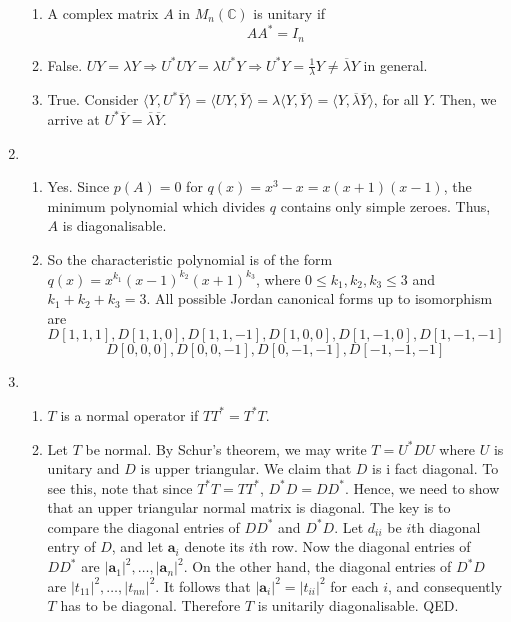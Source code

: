 \documentclass[12pt]{article}
\theoremstyle{definition}
\begin{document}
\begin{enumerate}
\begin{enumerate}
    \item A complex matrix $A$ in $M_n(\mathbb{C})$ is unitary if
    \[
AA^\ast = I_n
    \]
    \item False. $UY=\lambda Y \Rightarrow U^\ast UY=\lambda U^\ast Y\Rightarrow U^\ast Y=\frac{1}{\lambda}Y\neq \overline{\lambda}Y$ in general. 
    \item True. Consider $\langle Y, U^\ast \overline{Y}\rangle = \langle UY, \overline{Y}\rangle = \lambda\langle Y, \overline{Y}\rangle = \langle Y, \overline{\lambda}\overline{Y}\rangle$, for all $Y$. Then, we arrive at $U^\ast \overline{Y}=\overline{\lambda}\overline{Y}$.
  \end{enumerate}
  \item \begin{enumerate}
  \item Yes. Since $p(A)=0$ for $q(x)=x^3-x=x(x+1)(x-1)$, the minimum polynomial which divides $q$ contains only simple zeroes. Thus, $A$ is diagonalisable.
  \item So the characteristic polynomial is of the form $q(x)=x^{k_1}(x-1)^{k_2}(x+1)^{k_3}$, where $0\leq k_1,k_2,k_3\leq 3$ and $k_1+k_2+k_3=3$. All possible Jordan canonical forms up to isomorphism are
  \[
D[1,1,1], D[1,1,0], D[1,1,-1],D[1,0,0], D[1,-1,0], D[1,-1,-1]
  \]
  \[
 D[0,0,0], D[0,0,-1], D[0,-1,-1],D[-1,-1,-1]
  \]
\end{enumerate}
  \item \begin{enumerate}
  \item $T$ is a normal operator if $TT^\ast = T^\ast T$.
  \item Let $T$ be normal. By Schur's theorem, we may write $T=U^\ast DU$ where $U$ is unitary and $D$ is upper triangular. We claim that $D$ is i fact diagonal. To see this, note that since $T^\ast T = TT^\ast$, $D^\ast D = DD^\ast$. Hence, we need to show that an upper triangular normal matrix is diagonal. The key is to compare the diagonal entries of $DD^\ast$ and $D^\ast D$. Let $d_{ii}$ be $i$th diagonal entry of $D$, and let $\mathbf{a}_i$ denote its $i$th row. Now the diagonal entries of $DD^\ast$ are $|\mathbf{a}_1|^2, \ldots, |\mathbf{a}_n|^2$. On the other hand, the diagonal entries of $D^\ast D$ are $|t_{11}|^2,\ldots, |t_{nn}|^2$. It follows that $|\mathbf{a}_i|^2=|t_{ii}|^2$ for each $i$, and consequently $T$ has to be diagonal. Therefore $T$ is unitarily diagonalisable. QED.
\end{enumerate}
\end{enumerate}
\end{document}
